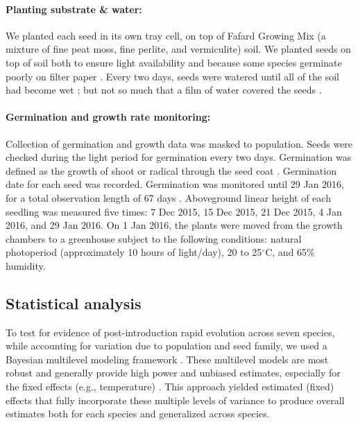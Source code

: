 \documentclass[12pt]{article}\usepackage[]{graphicx}\usepackage[]{color}
\begin{document}
	\paragraph{Planting substrate \& water:} We planted each seed in its own tray cell, on top of Fafard Growing Mix (a mixture of fine peat moss, fine perlite, and vermiculite) soil. We planted seeds on top of soil both to ensure light availability \parencite{Tester1987} and because some species germinate poorly on filter paper \parencite{Andrews1974}. Every two days, seeds were watered until all of the soil had become wet \parencite{Steinbauer1957}; but not so much that a film of water covered the seeds \parencite{AOSA1960}.
	
	\paragraph{Germination and growth rate monitoring:}  Collection of germination and growth data was masked to population. Seeds were checked during the light period for germination every two days. Germination was defined as the growth of shoot or radical through the seed coat \parencite{Baskin1998,Popay1970}. Germination date for each seed was recorded.  Germination was monitored until 29 Jan 2016, for a total observation length of 67 days  \parencite[this is longer than the typical two-week germination trials according to][]{Baskin1998,Wulff1994}. Aboveground linear height of each seedling was measured five times: 7 Dec 2015, 15 Dec 2015, 21 Dec 2015, 4 Jan 2016, and 29 Jan 2016. On 1 Jan 2016, the plants were moved from the growth chambers to a greenhouse subject to the following conditions: natural photoperiod (approximately 10 hours of light/day), 20 to 25$^\circ$C, and 65\% humidity.
	\subsection{Statistical analysis} 
	To test for evidence of post-introduction rapid evolution across seven species, while accounting for variation due to population and seed family, we used a Bayesian multilevel modeling framework \parencite{Carpenter2017}. These multilevel models are most
robust and generally provide high power and unbiased estimates, especially for the fixed effects (e.g., temperature) \parencite{Paccagnella2011}. This approach yielded estimated (fixed) effects that fully incorporate these multiple levels of variance to produce overall estimates both for each species and generalized across species. 
\end{document}

